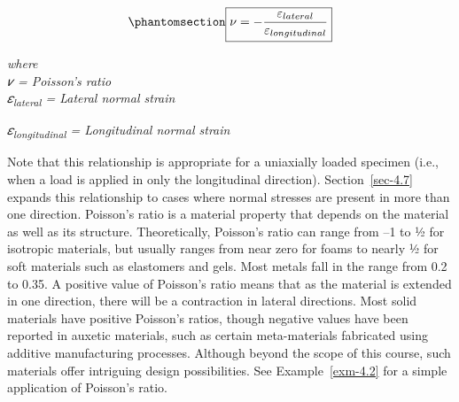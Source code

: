 \documentclass[
  letterpaper,
  DIV=11,
  numbers=noendperiod]{scrreprt}
\theoremstyle{definition}
\theoremstyle{remark}
\begin{document}
\begin{equation}\phantomsection\label{eq-4.2}{
\boxed{\nu=-\frac{\varepsilon_{lateral}}{\varepsilon_{longitudinal}}}
}\end{equation}

\emph{where}\\
\emph{𝜈 = Poisson's ratio}\\
\emph{𝜀\textsubscript{lateral} = Lateral normal strain}

\emph{𝜀\textsubscript{longitudinal} = Longitudinal normal strain}

Note that this relationship is appropriate for a uniaxially loaded
specimen (i.e., when a load is applied in only the longitudinal
direction). Section~\ref{sec-4.7} expands this relationship to cases
where normal stresses are present in more than one direction. Poisson's
ratio is a material property that depends on the material as well as its
structure. Theoretically, Poisson's ratio can range from --1 to ½ for
isotropic materials, but usually ranges from near zero for foams to
nearly ½ for soft materials such as elastomers and gels. Most metals
fall in the range from 0.2 to 0.35. A positive value of Poisson's ratio
means that as the material is extended in one direction, there will be a
contraction in lateral directions. Most solid materials have positive
Poisson's ratios, though negative values have been reported in auxetic
materials, such as certain meta-materials fabricated using additive
manufacturing processes. Although beyond the scope of this course, such
materials offer intriguing design possibilities. See
Example~\ref{exm-4.2} for a simple application of Poisson's ratio.
\end{document}
